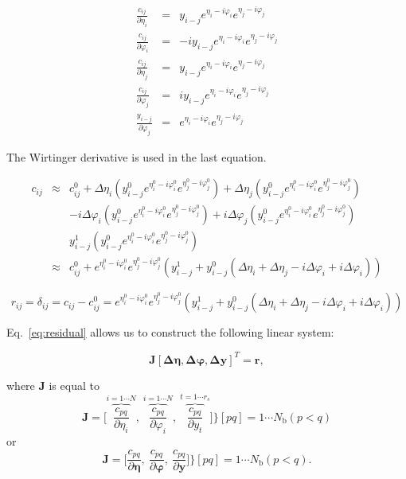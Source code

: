 \documentclass[a4paper,fleqn,usenatbib]{mnras}
\begin{document}
\begin{eqnarray}
\frac{c_{ij}}{\partial \eta_i} &=& y_{i-j} e^{\eta_i - i \varphi_i} e^{\eta_j - i \varphi_j}\\ 
\frac{c_{ij}}{\partial \varphi_i} &=&  -i y_{i-j} e^{\eta_i - i \varphi_i} e^{\eta_j - i \varphi_j}\\
\frac{c_{ij}}{\partial \eta_j} &=& y_{i-j} e^{\eta_i - i \varphi_i} e^{\eta_j - i \varphi_j}\\ 
\frac{c_{ij}}{\partial \varphi_j} &=&  i y_{i-j} e^{\eta_i - i \varphi_i} e^{\eta_j - i \varphi_j}\\
\frac{y_{i-j}}{\partial \varphi_j} &=&  e^{\eta_i - i \varphi_i} e^{\eta_j - i \varphi_j}
\end{eqnarray}

The Wirtinger derivative is used in the last equation.

\begin{eqnarray}
c_{ij} &\approx& c_{ij}^0 + \Delta \eta_i(y_{i-j}^0 e^{\eta_i^0 - i \varphi_i^0} e^{\eta_j^0 - i \varphi_j^0}) + \Delta \eta_j(y_{i-j}^0 e^{\eta_i^0 - i \varphi_i^0} e^{\eta_j^0 - i \varphi_j^0})\\
&& -i\Delta\varphi_i (y_{i-j}^0e^{\eta_i^0 - i \varphi_i^0} e^{\eta_j^0 - i \varphi_j^0}) +i\Delta\varphi_j (y_{i-j}^0e^{\eta_i^0 - i \varphi_i^0} e^{\eta_j^0 - i \varphi_j^0})\\
&& y_{i-j}^1(y_{i-j}^0e^{\eta_i^0 - i \varphi_i^0} e^{\eta_j^0 - i \varphi_j^0})\\
&\approx&  c_{ij}^0 + e^{\eta_i^0 - i \varphi_i^0} e^{\eta_j^0 - i \varphi_j^0}(y_{i-j}^1 + y_{i-j}^0( \Delta \eta_i+ \Delta \eta_j - i\Delta\varphi_i + i\Delta\varphi_i))
\end{eqnarray}

\begin{equation}
\label{eq:residual}
r_{ij} = \delta_{ij} = c_{ij}-c_{ij}^0 = e^{\eta_i^0 - i \varphi_i^0} e^{\eta_j^0 - i \varphi_j^0}(y_{i-j}^1 + y_{i-j}^0( \Delta \eta_i+ \Delta \eta_j - i\Delta\varphi_i + i\Delta\varphi_i)) 
\end{equation}

Eq.~\ref{eq:residual} allows us to construct the following linear system:

\begin{equation}
\boldsymbol{J}[\boldsymbol{\Delta \eta},\boldsymbol{\Delta \varphi},\boldsymbol{\Delta y}]^T = \boldsymbol{r}, 
\end{equation}

where $\boldsymbol{J}$ is equal to 
\begin{equation}
\boldsymbol{J} = \bigg [\overbrace{\frac{c_{pq}}{\partial \eta_i}}^{i= 1\cdots N},~\overbrace{\frac{c_{pq}}{\partial \varphi_i}}^{i= 1\cdots N},~\overbrace{\frac{c_{pq}}{\partial y_{t}}}^{t=1\cdots r_s} \bigg ] \bigg \} [pq] = 1\cdots N_{\textrm{b}} (p<q) 
\end{equation}
or
\begin{equation}
\boldsymbol{J} = \bigg [\frac{c_{pq}}{\partial \boldsymbol{\eta}},~\frac{c_{pq}}{\partial \boldsymbol{\varphi}},~\frac{c_{pq}}{\partial \boldsymbol{y}} \bigg ] \bigg \} [pq] = 1\cdots N_{\textrm{b}} (p<q). 
\end{equation}
\end{document}
